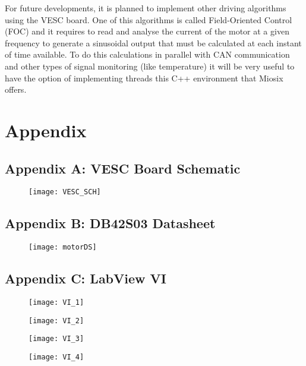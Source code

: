 For future developments, it is planned to implement other driving algorithms using the VESC board. One of this algorithms is called Field-Oriented Control (FOC) and it requires to read and analyse the current of the motor at a given frequency to generate a sinusoidal output that must be calculated at each instant of time available. To do this calculations in parallel with CAN communication and other types of signal monitoring (like temperature) it will be very useful to have the option of implementing threads this C++ environment that Miosix offers.\\
\pagebreak

\section{Appendix}

\subsection{Appendix A: VESC Board Schematic}

\begin{figure} [H]
\centering\texttt{[image: VESC\_SCH]}
\label{fig:VESC_SCH}
\end{figure}

\pagebreak

\subsection{Appendix B: DB42S03 Datasheet}
\begin{figure} [H]
\centering\texttt{[image: motorDS]}
\label{fig:motorDS}
\end{figure}
\pagebreak

\subsection{Appendix C: LabView VI}
\begin{figure} [H]
\centering\texttt{[image: VI\_1]}
\label{fig:VI_1}
\end{figure}

\begin{figure} [H]
\centering\texttt{[image: VI\_2]}
\label{fig:VI_2}
\end{figure}

\begin{figure} [H]
\centering\texttt{[image: VI\_3]}
\label{fig:VI_3}
\end{figure}

\begin{figure} [H]
\centering\texttt{[image: VI\_4]}
\label{fig:VI_4}
\end{figure}
\pagebreak